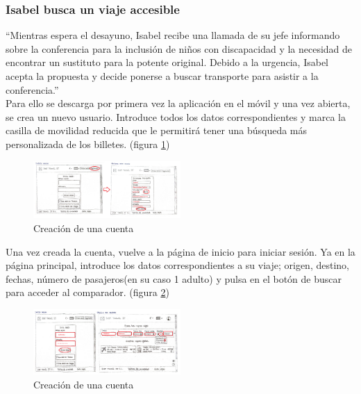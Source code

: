 \subsubsection{Isabel busca un viaje accesible}
“Mientras espera el desayuno, Isabel recibe una llamada de su jefe informando sobre la conferencia para la inclusión de niños con discapacidad y la necesidad de 
encontrar un sustituto para la potente original. Debido a la urgencia, Isabel acepta la propuesta y decide ponerse a buscar transporte para asistir a la conferencia.” \\

Para ello se descarga por primera vez la aplicación en el móvil y una vez abierta, se crea un nuevo usuario. Introduce todos los datos correspondientes y marca la 
casilla de movilidad reducida que le permitirá tener una búsqueda más personalizada de los billetes. (figura \ref{fig:Isabel1})
\begin{figure}[h]
    \centering
    \includegraphics[width=0.5\textwidth]{Imagenes/Keypath/Isabel1.png}
    \caption{Creación de una cuenta}
    \label{fig:Isabel1}
\end{figure}

Una vez creada la cuenta, vuelve a la página de inicio para iniciar sesión. Ya en la página principal, introduce los datos correspondientes a su viaje; origen, 
destino, fechas, número de pasajeros(en su caso 1 adulto) y pulsa en el botón de buscar para acceder al comparador. (figura \ref{fig:Isabel2})
\begin{figure}[h]
    \centering
    \includegraphics[width=0.5\textwidth]{Imagenes/Keypath/Isabel2.png}
    \caption{Creación de una cuenta}
    \label{fig:Isabel2}
\end{figure}

